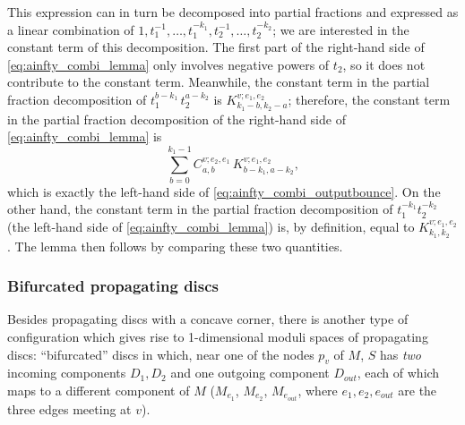 \documentclass[11pt,leqno]{amsart}
\numberwithin{equation}{section}
\begin{document}
This expression can in turn be decomposed into partial fractions and
expressed as a linear combination of
$1,t_1^{-1},\dots,t_1^{-k_1},t_2^{-1},\dots,t_2^{-k_2}$; we are interested
in the constant term of this decomposition. The first part of the right-hand side of
\eqref{eq:ainfty_combi_lemma} only involves negative powers of $t_2$, so it
does not contribute to the constant term. Meanwhile,
the constant term in the partial fraction decomposition of $t_1^{b-k_1}\,t_2^{a-k_2}$ is
$K_{k_1-b,k_2-a}^{v;e_1,e_2}$; therefore, the constant term in the
partial fraction decomposition of the right-hand side  of
\eqref{eq:ainfty_combi_lemma} is
$$\sum_{b=0}^{k_1-1} C_{a,b}^{v;e_2,e_1}\,K_{b-k_1,a-k_2}^{v;e_1,e_2},$$
which is exactly the left-hand side of \eqref{eq:ainfty_combi_outputbounce}.
On the other hand, the constant term in the partial fraction decomposition
of $t_1^{-k_1}t_2^{-k_2}$ (the left-hand side of
\eqref{eq:ainfty_combi_lemma}) is, by definition, equal to $K_{k_1,k_2}^{v;e_1,e_2}$.
The lemma then follows by comparing these two quantities.
\endproof

\subsubsection{Bifurcated propagating discs}\label{sss:bifurcated}
Besides propagating discs with a concave corner, there is another type of
configuration which gives rise to 1-dimensional moduli spaces of propagating
discs: ``bifurcated'' discs in which, near one of the nodes $p_v$ of $M$, 
$S$ has {\em two} incoming components $D_1,D_2$ and one outgoing component
$D_{out}$, each of which maps to a different component of
$M$ ($M_{e_1}$, $M_{e_2}$, $M_{e_{out}}$, where $e_1,e_2,e_{out}$ are the
three edges meeting at $v$). 
\end{document}
